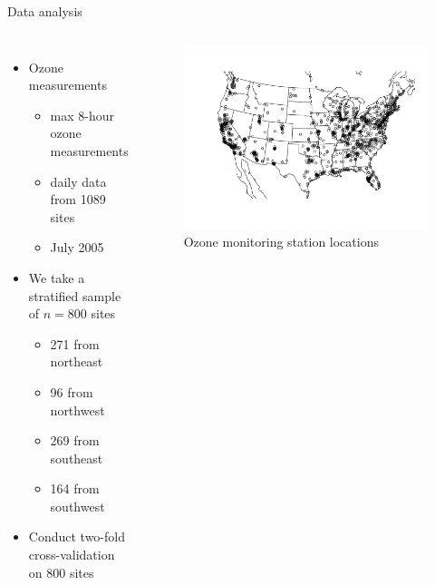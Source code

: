 \documentclass{beamer}
\begin{document}
\begin{frame}{Data analysis}
\begin{columns}[c]
	\begin{itemize} \setlength{\itemsep}{1em}
	\item Ozone measurements
	\begin{itemize}
		\item max 8-hour ozone measurements
		\item daily data from 1089 sites
		\item July 2005
	\end{itemize}
  \item We take a stratified sample of $n = 800$ sites
  \begin{itemize}
    \item 271 from northeast
    \item 96 from northwest
    \item 269 from southeast
    \item 164 from southwest
  \end{itemize}
  \item Conduct two-fold cross-validation on 800 sites
	\end{itemize}

	\begin{figure}
    \includegraphics[width=1\linewidth]{./plots/pot/ozone_stations.pdf}
    \caption{Ozone monitoring station locations}
    \end{figure}
\end{columns}
\end{frame}
\end{document}

